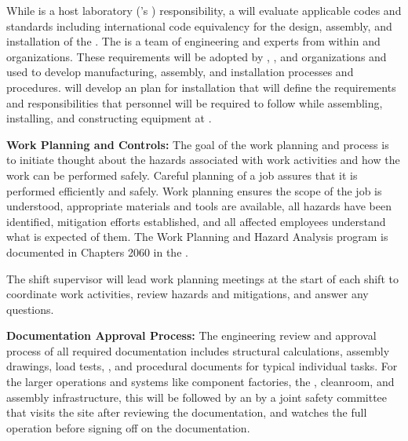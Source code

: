 While  is  a host laboratory ('s ) responsibility, a   will evaluate applicable codes and standards including international code equivalency for the design, assembly, and installation of the  . The  is  a team of engineering and  experts from within  and  organizations.  These requirements will be adopted by , , and  organizations and used to develop manufacturing, assembly, and installation processes and procedures. 
 will develop an %
 plan for installation that will define %
the  requirements and responsibilities that personnel will be required to follow while  assembling, installing, and constructing equipment at . %

{\bf Work Planning and Controls:} The goal of the work planning and  process is to initiate thought about the hazards associated with work activities and how the work can be performed safely. Careful planning of a job assures that it is performed efficiently and safely. Work planning ensures the scope of the job is understood, appropriate materials and tools are available, all hazards have been identified, mitigation efforts established, and all affected employees understand what is expected of them. %
The Work Planning and Hazard Analysis program is documented in Chapters 2060 in the .

The shift supervisor will lead %
work planning meetings at the start of each shift to coordinate work activities, review hazards and mitigations, and answer any questions.

{\bf Documentation Approval Process:} The engineering review and approval process of all required documentation includes structural calculations, assembly drawings, load tests, , and procedural documents for  typical individual tasks.  For the larger operations and systems like  component factories, the , cleanroom, and assembly infrastructure, this will be followed by an  by a joint safety committee that visits the site  after reviewing the documentation, and watches the full operation before signing off on the documentation.

